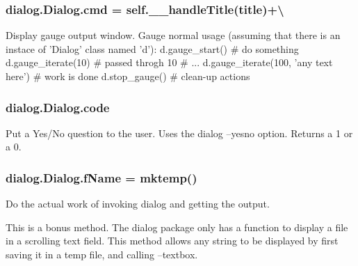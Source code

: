 \subsubsection[{\texorpdfstring{cmd}{cmd}}]{\setlength{\rightskip}{0pt plus 5cm}dialog.\+Dialog.\+cmd = self.\+\_\+\+\_\+handle\+Title({\bf title})+\textbackslash{}\hspace{0.3cm}{\ttfamily [static]}}\hypertarget{classdialog_1_1_dialog_ab6a920ce7ea89873b4dfe4f8a2aa57a4}{}\label{classdialog_1_1_dialog_ab6a920ce7ea89873b4dfe4f8a2aa57a4}
\begin{DoxyVerb}Display gauge output window.
Gauge normal usage (assuming that there is an instace of 'Dialog'
class named 'd'):
d.gauge_start()
# do something
d.gauge_iterate(10)  # passed throgh 10%
# ...
d.gauge_iterate(100, 'any text here')  # work is done
d.stop_gauge()  # clean-up actions
\end{DoxyVerb}
\subsubsection[{\texorpdfstring{code}{code}}]{\setlength{\rightskip}{0pt plus 5cm}dialog.\+Dialog.\+code\hspace{0.3cm}{\ttfamily [static]}}\hypertarget{classdialog_1_1_dialog_ab04de1cc408c62ca48ca5bdf13e86a3c}{}\label{classdialog_1_1_dialog_ab04de1cc408c62ca48ca5bdf13e86a3c}
\begin{DoxyVerb}Put a Yes/No question to the user.
Uses the dialog --yesno option.
Returns a 1 or a 0.
\end{DoxyVerb}
\subsubsection[{\texorpdfstring{f\+Name}{fName}}]{\setlength{\rightskip}{0pt plus 5cm}dialog.\+Dialog.\+f\+Name = mktemp()\hspace{0.3cm}{\ttfamily [static]}}\hypertarget{classdialog_1_1_dialog_a2da7c4ce546ef9e24ff1af7c01590a91}{}\label{classdialog_1_1_dialog_a2da7c4ce546ef9e24ff1af7c01590a91}
\begin{DoxyVerb}Do the actual work of invoking dialog and getting the output.\end{DoxyVerb}


\begin{DoxyVerb}This is a bonus method.  The dialog package only has a function to
display a file in a scrolling text field.  This method allows any
string to be displayed by first saving it in a temp file, and calling
--textbox.
\end{DoxyVerb}
